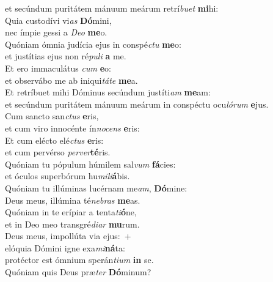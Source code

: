 \oddverse et secúndum puritátem mánuum meárum retrí\textit{bu}\textit{et} \textbf{mi}hi:\\
\evenverse Quia custodívi vi\textit{as} \textbf{Dó}mini,~\*\\
\evenverse nec ímpie gessi a \textit{De}\textit{o} \textbf{me}o.\\
\oddverse Quóniam ómnia judícia ejus in conspé\textit{ctu} \textbf{me}o:~\*\\
\oddverse et justítias ejus non ré\textit{pu}\textit{li} \textbf{a} me.\\
\evenverse Et ero immaculátus \textit{cum} \textbf{e}o:~\*\\
\evenverse et observábo me ab iniqui\textit{tá}\textit{te} \textbf{me}a.\\
\oddverse Et retríbuet mihi Dóminus secúndum justíti\textit{am} \textbf{me}am:~\*\\
\oddverse et secúndum puritátem mánuum meárum in conspéctu ocu\textit{ló}\textit{rum} \textbf{e}jus.\\
\evenverse Cum sancto san\textit{ctus} \textbf{e}ris,~\*\\
\evenverse et cum viro innocénte ín\textit{no}\textit{cens} \textbf{e}ris:\\
\oddverse Et cum elécto elé\textit{ctus} \textbf{e}ris:~\*\\
\oddverse et cum pervérso \textit{per}\textit{ver}\textbf{té}ris.\\
\evenverse Quóniam tu pópulum húmilem sal\textit{vum} \textbf{fá}cies:~\*\\
\evenverse et óculos superbórum hu\textit{mi}\textit{li}\textbf{á}bis.\\
\oddverse Quóniam tu illúminas lucérnam me\textit{am}, \textbf{Dó}mine:~\*\\
\oddverse Deus meus, illúmina té\textit{ne}\textit{bras} \textbf{me}as.\\
\evenverse Quóniam in te erípiar a tenta\textit{ti}\textbf{ó}ne,~\*\\
\evenverse et in Deo meo transgré\textit{di}\textit{ar} \textbf{mu}rum.\\
\oddverse Deus meus, impollúta via ejus:~+\\
\oddverse  elóquia Dómini igne exa\textit{mi}\textbf{ná}ta:~\*\\
\oddverse protéctor est ómnium sperán\textit{ti}\textit{um} \textbf{in} se.\\
\evenverse Quóniam quis Deus præ\textit{ter} \textbf{Dó}minum?~\*\\
